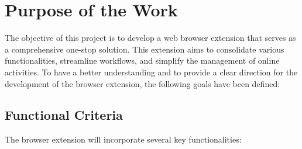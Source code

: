 %
%
\section{Purpose of the Work}\label{sec:intro:goal}

The objective of this project is to develop a web browser extension that serves as a comprehensive one-stop solution. This extension aims to consolidate various functionalities, streamline workflows, and simplify the management of online activities. To have a better understanding and to provide a clear direction for the development of the browser extension, the following goals have been defined:

\subsection{Functional Criteria}
The browser extension will incorporate several key functionalities:

